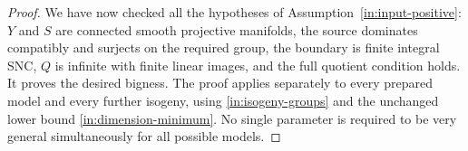 \begin{proof}
We have now checked all the hypotheses of
Assumption~\ref{in:input-positive}: $Y$ and $S$ are connected smooth
projective manifolds, the source dominates compatibly and surjects on
the required group, the boundary is finite integral SNC, $Q$ is
infinite with finite linear images, and the full quotient condition
holds.  It proves the desired bigness.  The proof applies separately
to every prepared model and every further isogeny, using
\eqref{in:isogeny-groups} and the unchanged lower bound
\eqref{in:dimension-minimum}.  No single parameter is required to be
very general simultaneously for all possible models.
\end{proof}
